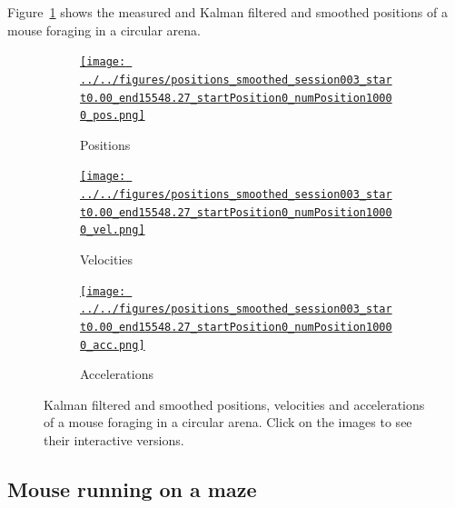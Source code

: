 \documentclass[12pt]{article}
\begin{document}
Figure~\ref{fig:foraging} shows the measured and Kalman filtered and smoothed
positions of a mouse foraging in a circular arena.

\begin{figure}
    \begin{center}

        \begin{subfigure}{\textwidth}
            \centering
            \href{http://www.gatsby.ucl.ac.uk/~rapela/fwg/lds_repo/inference/figures/positions_smoothed_session003_start0.00_end15548.27_startPosition0_numPosition10000_pos.html}{\texttt{[image: ../../figures/positions\_smoothed\_session003\_start0.00\_end15548.27\_startPosition0\_numPosition10000\_pos.png]}}
            \caption{Positions}
        \end{subfigure}

        \begin{subfigure}{\textwidth}
            \centering
            \href{http://www.gatsby.ucl.ac.uk/~rapela/fwg/lds_repo/inference/figures/positions_smoothed_session003_start0.00_end15548.27_startPosition0_numPosition10000_vel.html}{\texttt{[image: ../../figures/positions\_smoothed\_session003\_start0.00\_end15548.27\_startPosition0\_numPosition10000\_vel.png]}}
            \caption{Velocities}
        \end{subfigure}

        \begin{subfigure}{\textwidth}
            \centering
            \href{http://www.gatsby.ucl.ac.uk/~rapela/fwg/lds_repo/inference/figures/positions_smoothed_session003_start0.00_end15548.27_startPosition0_numPosition10000_acc.html}{\texttt{[image: ../../figures/positions\_smoothed\_session003\_start0.00\_end15548.27\_startPosition0\_numPosition10000\_acc.png]}}
            \caption{Accelerations}
        \end{subfigure}


        \caption{Kalman filtered and smoothed positions, velocities and
        accelerations of a mouse foraging in a circular arena. Click on the
        images to see their interactive versions.}

        \label{fig:foraging}

    \end{center}
\end{figure}

\subsection{Mouse running on a maze}
\end{document}
